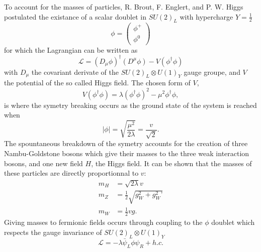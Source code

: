    To account for the masses of particles, R. Brout, F. Englert, and P. W. Higgs postulated the existance of a scalar doublet in $ SU(2)_L $ with hypercharge $ Y = \frac{1}{2} $
    \begin{equation}
      \phi = \left( \begin{matrix} \phi^+ \\ \phi^0 \end{matrix} \right)
    \end{equation}
    for which the Lagrangian can be written as
    \begin{equation}
      \mathcal{L} = \left( D_\mu \phi \right)^\dagger \left( D^\mu \phi \right) - V(\phi^\dagger \phi)
    \end{equation}
    with $ D_\mu $ the covariant derivate of the $ SU(2)_L \otimes U(1)_Y $ gauge groupe, and $ V $ the potential of the so called Higgs field. The chosen form of $ V $,
    \begin{equation}
      V(\phi^\dagger \phi) = \lambda \left( \phi^\dagger \phi \right)^2 - \mu^2 \phi^\dagger \phi ,
    \end{equation}
    is where the symetry breaking occurs as the ground state of the system is reached when
    \begin{equation}
      \left| \phi \right| = \sqrt{\frac{\mu^2}{2 \lambda}} = \frac{v}{\sqrt{2}} .
    \end{equation}
    The spountaneous breakdown of the symetry accounts for the creation of three Nambu-Goldstone bosons which give their masses to the three weak interaction bosons, and one new field $ H $, the Higgs field. It can be shown that the masses of these particles are directly proportionnal to $ v $:
    \begin{align}
      m_H & = \sqrt{2 \lambda} v \\
      m_Z & = \frac{1}{2} \sqrt{g_W^2 + g_W^2\text{'}} \\
      m_W & = \frac{1}{2} v g .
    \end{align}
    Giving masses to fermionic fields occurs through coupling to the $ \phi $ doublet which respects the gauge invariance of $ SU(2)_L \otimes U(1)_Y $
    \begin{equation}
      \mathcal{L} = - \lambda \bar{\psi}_L \phi \psi_R + h.c.
    \end{equation} \\

